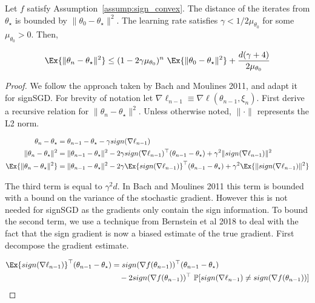 \documentclass[12pt]{article}
\begin{document}
\begin{theorem}
\label{thm:convex}
Let $f$ satisfy Assumption~\ref{assump:sign_convex}. 
The distance of the iterates from $\theta_\star$ is bounded by $\| \theta_0 - \theta_\star \|^2$.
The learning rate satisfies $\gamma < 1 / 2 \mu_{\theta_0}$ for some $\mu_{\theta_0} > 0$.
Then,

\begin{equation*}
\Ex{ \| \theta_n - \theta_\star \|^2 } \leq ( 1 - 2 \gamma \mu_{\theta_0} )^n \ \Ex{ \| \theta_{0} - \theta_\star \|^2 } + \frac{d ( \gamma + 4)}{2 \mu_{\theta_0}}
\end{equation*}
\end{theorem}

\begin{proof}
We follow the approach taken by Bach and Moulines 2011, and adapt it for signSGD.
For brevity of notation let $\nabla \ell_{n-1} \equiv \nabla \ell ( \theta_{n-1}, \xi_n )$.
First derive a recursive relation for $\| \theta_n - \theta_\star \|^2$.
Unless otherwise noted, $\| \cdot \|$ represents the L2 norm.

\begin{align*}
\theta_n - \theta_\star &= \theta_{n-1} - \theta_\star - \gamma sign ( \nabla \ell_{n-1} ) \\
\| \theta_n - \theta_\star \|^2 &= \| \theta_{n-1} - \theta_\star \|^2  - 2 \gamma sign ( \nabla \ell_{n-1} )^\top ( \theta_{n-1} - \theta_\star) + \gamma^2 \| sign ( \nabla \ell_{n-1} ) \|^2 \\
\Ex{ \| \theta_n - \theta_\star \|^2 } &= \| \theta_{n-1} - \theta_\star \|^2  - 2 \gamma \Ex{ sign ( \nabla \ell_{n-1} ) }^\top ( \theta_{n-1} - \theta_\star ) + \gamma^2 \Ex{ \| sign ( \nabla \ell_{n-1} ) \|^2 } \\
\end{align*}

The third term is equal to $\gamma^2 d$.
In Bach and Moulines 2011 this term is bounded with a bound on the variance of the stochastic gradient.
However this is not needed for signSGD as the gradients only contain the sign information.
To bound the second term, we use a technique from Bernstein et al 2018 to deal with the fact that the sign gradient is now a biased estimate of the true gradient.
First decompose the gradient estimate.

\begin{align*}
\Ex{ sign ( \nabla \ell_{n-1} ) }^\top ( \theta_{n-1} - \theta_\star)
&= sign ( \nabla f ( \theta_{n-1} ) )^\top ( \theta_{n-1} - \theta_\star ) \\
&\quad - 2 sign( \nabla f ( \theta_{n-1} ) )^\top \ \mathbb{P} [ sign( \nabla \ell_{n-1} ) \neq sign( \nabla f ( \theta_{n-1} ) ) ] \\
\end{align*}


\end{proof}
\end{document}
